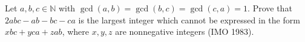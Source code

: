 Let $a, b, c \in \mathbb{N}$ with $\gcd(a, b) = \gcd(b, c) = \gcd(c, a) = 1$. Prove that $2abc - ab - bc - ca$ is the largest integer which cannot be expressed in the form $xbc + yca + zab$, where $x, y, z$ are nonnegative integers (IMO 1983).
